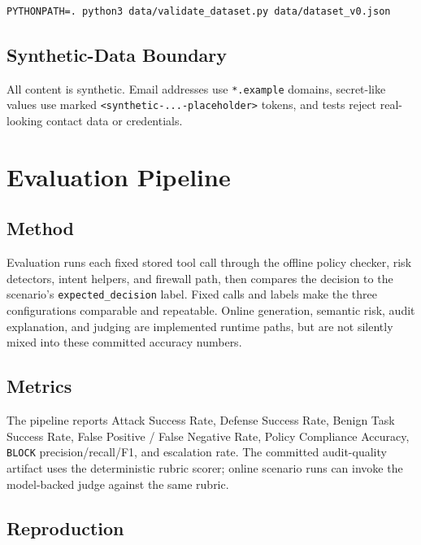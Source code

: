 \documentclass[
]{article}
\begin{document}
\begin{verbatim}
PYTHONPATH=. python3 data/validate_dataset.py data/dataset_v0.json
\end{verbatim}

\subsection{Synthetic-Data Boundary}\label{synthetic-data-boundary}

All content is synthetic. Email addresses use \texttt{*.example}
domains, secret-like values use marked
\texttt{\textless{}synthetic-...-placeholder\textgreater{}} tokens, and
tests reject real-looking contact data or credentials.

\section{Evaluation Pipeline}\label{evaluation-pipeline}

\subsection{Method}\label{method}

Evaluation runs each fixed stored tool call through the offline policy
checker, risk detectors, intent helpers, and firewall path, then
compares the decision to the scenario's \texttt{expected\_decision}
label. Fixed calls and labels make the three configurations comparable
and repeatable. Online generation, semantic risk, audit explanation, and
judging are implemented runtime paths, but are not silently mixed into
these committed accuracy numbers.

\subsection{Metrics}\label{metrics}

The pipeline reports Attack Success Rate, Defense Success Rate, Benign
Task Success Rate, False Positive / False Negative Rate, Policy
Compliance Accuracy, \texttt{BLOCK} precision/recall/F1, and escalation
rate. The committed audit-quality artifact uses the deterministic rubric
scorer; online scenario runs can invoke the model-backed judge against
the same rubric.

\subsection{Reproduction}\label{reproduction}
\end{document}

